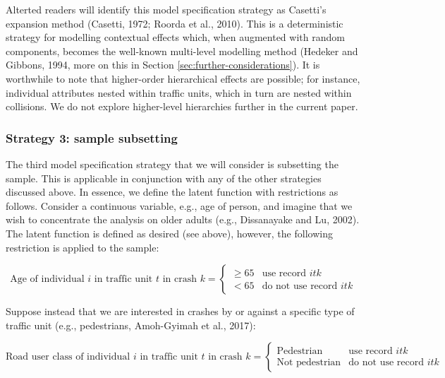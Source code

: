 \documentclass[]{elsarticle} %
\begin{document}
Alterted readers will identify this model specification strategy as
Casetti's expansion method (Casetti, 1972; Roorda et al., 2010). This is
a deterministic strategy for modelling contextual effects which, when
augmented with random components, becomes the well-known multi-level
modelling method (Hedeker and Gibbons, 1994, more on this in Section
\ref{sec:further-considerations}). It is worthwhile to note that
higher-order hierarchical effects are possible; for instance, individual
attributes nested within traffic units, which in turn are nested within
collisions. We do not explore higher-level hierarchies further in the
current paper.

\hypertarget{strategy-3-sample-subsetting}{%
\subsubsection{Strategy 3: sample
subsetting}\label{strategy-3-sample-subsetting}}

The third model specification strategy that we will consider is
subsetting the sample. This is applicable in conjunction with any of the
other strategies discussed above. In essence, we define the latent
function with restrictions as follows. Consider a continuous variable,
e.g., age of person, and imagine that we wish to concentrate the
analysis on older adults (e.g., Dissanayake and Lu, 2002). The latent
function is defined as desired (see above), however, the following
restriction is applied to the sample:

\begin{equation}
\label{eq:sampling-age}
\text{Age of individual } i \text{ in traffic unit } t \text{ in crash } k = 
\begin{cases}
\ge 65 & \text{use record } itk\\
< 65 & \text{do not use record } itk
\end{cases}
\end{equation}

Suppose instead that we are interested in crashes by or against a
specific type of traffic unit (e.g., pedestrians, Amoh-Gyimah et al.,
2017):

\begin{equation}
\label{eq:sampling-pedestrian}
\text{Road user class of individual } i \text{ in traffic unit } t \text{ in crash } k = 
\begin{cases}
\text{Pedestrian} & \text{use record } itk\\
\text{Not pedestrian} & \text{do not use record } itk
\end{cases}
\end{equation}
\end{document}
